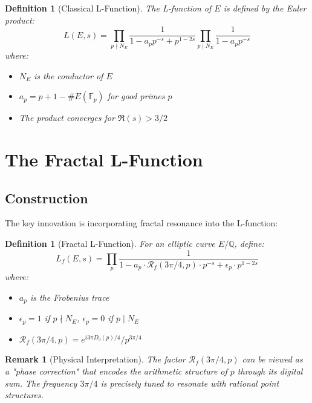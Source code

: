 \documentclass[12pt]{article}
\newcommand{\Q}{\mathbb{Q}}
\newcommand{\F}{\mathbb{F}}
\newcommand{\fractalres}{\mathcal{R}_f}
\newcommand{\digitalsum}{D_3}
\newtheorem{definition}[theorem]{Definition}
\newtheorem{remark}[theorem]{Remark}
\begin{document}
\begin{definition}[Classical L-Function]
The L-function of $E$ is defined by the Euler product:
\begin{equation}
L(E,s) = \prod_{p \nmid N_E} \frac{1}{1 - a_p p^{-s} + p^{1-2s}} \prod_{p \mid N_E} \frac{1}{1 - a_p p^{-s}}
\end{equation}
where:
\begin{itemize}
\item $N_E$ is the conductor of $E$
\item $a_p = p + 1 - \#E(\F_p)$ for good primes $p$
\item The product converges for $\Re(s) > 3/2$
\end{itemize}
\end{definition}

\section{The Fractal L-Function}

\subsection{Construction}

The key innovation is incorporating fractal resonance into the L-function:

\begin{definition}[Fractal L-Function]
\label{def:fractal_L}
For an elliptic curve $E/\Q$, define:
\begin{equation}
L_f(E,s) = \prod_p \frac{1}{1 - a_p \cdot \fractalres(3\pi/4, p) \cdot p^{-s} + \epsilon_p \cdot p^{1-2s}}
\end{equation}
where:
\begin{itemize}
\item $a_p$ is the Frobenius trace
\item $\epsilon_p = 1$ if $p \nmid N_E$, $\epsilon_p = 0$ if $p \mid N_E$
\item $\fractalres(3\pi/4, p) = e^{i3\pi\digitalsum(p)/4}/p^{3\pi/4}$
\end{itemize}
\end{definition}

\begin{remark}[Physical Interpretation]
The factor $\fractalres(3\pi/4, p)$ can be viewed as a "phase correction" that encodes the arithmetic structure of $p$ through its digital sum. The frequency $3\pi/4$ is precisely tuned to resonate with rational point structures.
\end{remark}
\end{document}

